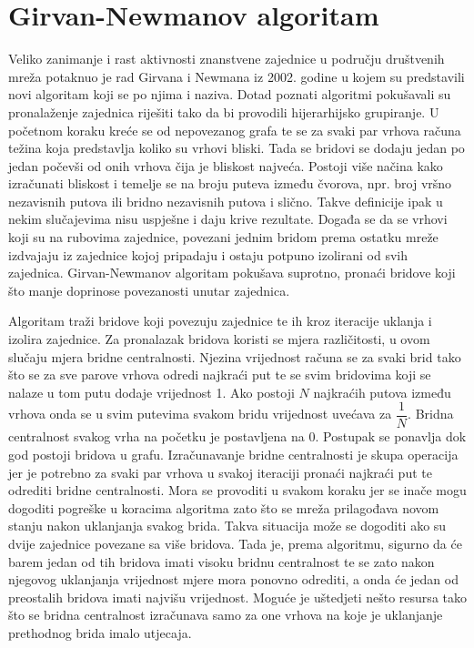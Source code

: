 \section{Girvan-Newmanov algoritam}

Veliko zanimanje i rast aktivnosti znanstvene zajednice u području društvenih mreža potaknuo je rad \cite{girvan2002community} Girvana i Newmana iz 2002. godine  u kojem su predstavili novi algoritam koji se po njima i naziva. Dotad poznati algoritmi pokušavali su pronalaženje zajednica riješiti tako da bi provodili hijerarhijsko grupiranje. U početnom koraku kreće se od nepovezanog grafa te se za svaki par vrhova računa težina koja predstavlja koliko su vrhovi bliski. Tada se bridovi se dodaju jedan po jedan počevši od onih vrhova čija je bliskost najveća. Postoji više načina kako izračunati bliskost i temelje se na broju puteva između čvorova, npr. broj vršno nezavisnih putova ili bridno nezavisnih putova i slično. Takve definicije ipak u nekim slučajevima nisu uspješne i daju krive rezultate. Događa se da se vrhovi koji su na rubovima zajednice, povezani jednim bridom prema ostatku mreže izdvajaju iz zajednice kojoj pripadaju i ostaju potpuno izolirani od svih zajednica. Girvan-Newmanov algoritam pokušava suprotno, pronaći bridove koji što manje doprinose povezanosti unutar zajednica. 

Algoritam traži bridove koji povezuju zajednice te ih kroz iteracije uklanja i izolira zajednice. Za pronalazak bridova koristi se mjera različitosti, u ovom slučaju mjera bridne centralnosti. Njezina vrijednost računa se za svaki brid tako što se za sve parove vrhova odredi najkraći put te se svim bridovima koji se nalaze u tom putu dodaje vrijednost 1. Ako postoji $N$ najkraćih putova između vrhova onda se u svim putevima svakom bridu vrijednost uvećava za $ \dfrac{1}{N} $. Bridna centralnost svakog vrha na početku je postavljena na 0. Postupak se ponavlja dok god postoji bridova u grafu. Izračunavanje bridne centralnosti je skupa operacija jer je potrebno za svaki par vrhova u svakoj iteraciji pronaći najkraći put te odrediti bridne centralnosti. Mora se provoditi u svakom koraku jer se inače mogu dogoditi pogreške u koracima algoritma zato što se mreža prilagođava novom stanju nakon uklanjanja svakog brida. Takva situacija može se dogoditi ako su dvije zajednice povezane sa više bridova. Tada je, prema algoritmu, sigurno da će barem jedan od tih bridova imati visoku bridnu centralnost te se zato nakon njegovog uklanjanja vrijednost mjere mora ponovno odrediti, a onda će jedan od preostalih bridova imati najvišu vrijednost. Moguće je uštedjeti nešto resursa tako što se bridna centralnost izračunava samo za one vrhova na koje je uklanjanje prethodnog brida imalo utjecaja. 

